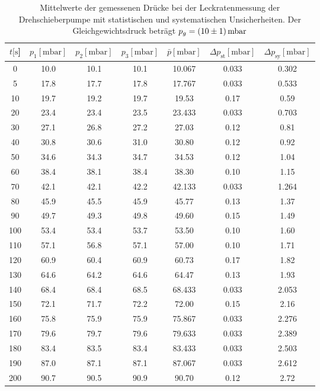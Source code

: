 %
\begin{table}[H]
  \centering
    \caption{Mittelwerte der gemessenen Drücke bei der Leckratenmessung der Drehschieberpumpe mit statistischen und systematischen Unsicherheiten. Der Gleichgewichtsdruck beträgt $p_g=\SI{10 \pm 1}{\milli\bar}$}
    \label{tab:Dreh_Leck2}
    \begin{tabular}{
      S[table-format=3.0] 
      S[table-format=2.1] S[table-format=2.1] S[table-format=2.1]
      S[table-format=2.2] S[table-format=1.2] S[table-format=1.2]
      }
      \toprule
      {$t [\si{\second}$]} &
      {$p_1 [\si{\milli\bar}]$} & {$p_2 [\si{\milli\bar}]$} & {$p_3 [\si{\milli\bar}]$} &
      {$\bar{p} [\si{\milli\bar}]$} & {$\Delta p_\text{st} [\si{\milli\bar}]$} & {$\Delta p_\text{sy} [\si{\milli\bar}]$}\\
           & 10.0 & 10.1 & 10.1 & 10.067 & 0.033 & 0.302 \\
      5     & 17.8 & 17.7 & 17.8 & 17.767 & 0.033 & 0.533 \\
      10    & 19.7 & 19.2 & 19.7 & 19.53  & 0.17  & 0.59  \\
      20    & 23.4 & 23.4 & 23.5 & 23.433 & 0.033 & 0.703 \\
      30    & 27.1 & 26.8 & 27.2 & 27.03  & 0.12  & 0.81  \\
      40    & 30.8 & 30.6 & 31.0 & 30.80  & 0.12  & 0.92  \\
      50    & 34.6 & 34.3 & 34.7 & 34.53  & 0.12  & 1.04  \\
      60    & 38.4 & 38.1 & 38.4 & 38.30  & 0.10  & 1.15  \\
      70    & 42.1 & 42.1 & 42.2 & 42.133 & 0.033 & 1.264 \\
      80    & 45.9 & 45.5 & 45.9 & 45.77  & 0.13  & 1.37  \\
      90    & 49.7 & 49.3 & 49.8 & 49.60  & 0.15  & 1.49  \\
      100   & 53.4 & 53.4 & 53.7 & 53.50  & 0.10  & 1.60  \\
      110   & 57.1 & 56.8 & 57.1 & 57.00  & 0.10  & 1.71  \\
      120   & 60.9 & 60.4 & 60.9 & 60.73  & 0.17  & 1.82  \\
      130   & 64.6 & 64.2 & 64.6 & 64.47  & 0.13  & 1.93  \\
      140   & 68.4 & 68.4 & 68.5 & 68.433 & 0.033 & 2.053 \\
      150   & 72.1 & 71.7 & 72.2 & 72.00  & 0.15  & 2.16  \\
      160   & 75.8 & 75.9 & 75.9 & 75.867 & 0.033 & 2.276 \\
      170   & 79.6 & 79.7 & 79.6 & 79.633 & 0.033 & 2.389 \\
      180   & 83.4 & 83.5 & 83.4 & 83.433 & 0.033 & 2.503 \\
      190   & 87.0 & 87.1 & 87.1 & 87.067 & 0.033 & 2.612 \\
      200   & 90.7 & 90.5 & 90.9 & 90.70  & 0.12  & 2.72  \\
    \bottomrule
    \end{tabular}
\end{table}
